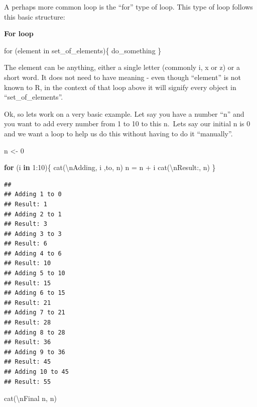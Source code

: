 \documentclass[
]{book}
\newenvironment{Shaded}{\begin{snugshade}}{\end{snugshade}}
\newcommand{\ControlFlowTok}[1]{\textcolor[rgb]{0.13,0.29,0.53}{\textbf{#1}}}
\newcommand{\DecValTok}[1]{\textcolor[rgb]{0.00,0.00,0.81}{#1}}
\newcommand{\FunctionTok}[1]{\textcolor[rgb]{0.00,0.00,0.00}{#1}}
\newcommand{\NormalTok}[1]{#1}
\newcommand{\OtherTok}[1]{\textcolor[rgb]{0.56,0.35,0.01}{#1}}
\newcommand{\SpecialCharTok}[1]{\textcolor[rgb]{0.00,0.00,0.00}{#1}}
\newcommand{\StringTok}[1]{\textcolor[rgb]{0.31,0.60,0.02}{#1}}
\begin{document}
A perhaps more common loop is the ``for'' type of loop.
This type of loop follows this basic structure:

\textbf{For loop}

for (element in set\_of\_elements)\{
do\_something
\}

The element can be anything, either a single letter (commonly i, x or z) or a short word. It does not need to have meaning - even though ``element'' is not known to R, in the context of that loop above it will signify every object in ``set\_of\_elements''.

Ok, so lets work on a very basic example. Let say you have a number ``n'' and you want to add every number from 1 to 10 to this n.~Lets say our initial n is 0 and we want a loop to help us do this without having to do it ``manually''.

\begin{Shaded}
\begin{Highlighting}[]
\NormalTok{n }\OtherTok{\textless{}{-}} \DecValTok{0}

\ControlFlowTok{for}\NormalTok{ (i }\ControlFlowTok{in} \DecValTok{1}\SpecialCharTok{:}\DecValTok{10}\NormalTok{)\{}
  \FunctionTok{cat}\NormalTok{(}\StringTok{\textquotesingle{}}\SpecialCharTok{\textbackslash{}n}\StringTok{Adding\textquotesingle{}}\NormalTok{, i ,}\StringTok{\textquotesingle{}to\textquotesingle{}}\NormalTok{, n)}
\NormalTok{  n }\OtherTok{=}\NormalTok{ n }\SpecialCharTok{+}\NormalTok{ i}
  \FunctionTok{cat}\NormalTok{(}\StringTok{\textquotesingle{}}\SpecialCharTok{\textbackslash{}n}\StringTok{Result:\textquotesingle{}}\NormalTok{, n)}
\NormalTok{\}}
\end{Highlighting}
\end{Shaded}

\begin{verbatim}
## 
## Adding 1 to 0
## Result: 1
## Adding 2 to 1
## Result: 3
## Adding 3 to 3
## Result: 6
## Adding 4 to 6
## Result: 10
## Adding 5 to 10
## Result: 15
## Adding 6 to 15
## Result: 21
## Adding 7 to 21
## Result: 28
## Adding 8 to 28
## Result: 36
## Adding 9 to 36
## Result: 45
## Adding 10 to 45
## Result: 55
\end{verbatim}

\begin{Shaded}
\begin{Highlighting}[]
\FunctionTok{cat}\NormalTok{(}\StringTok{\textquotesingle{}}\SpecialCharTok{\textbackslash{}n}\StringTok{Final n\textquotesingle{}}\NormalTok{, n)}
\end{Highlighting}
\end{Shaded}
\end{document}
